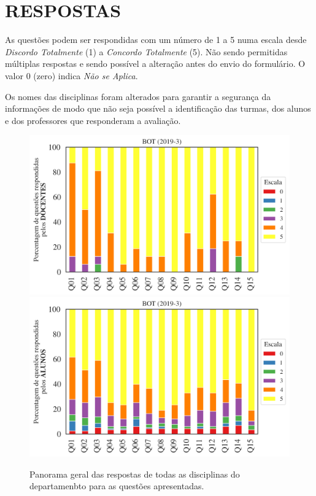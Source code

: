 \documentclass[a4paper,10pt]{article}
\begin{document}
\section{RESPOSTAS}
As questões podem ser respondidas com um número de 1 a 5 numa escala desde {\it Discordo Totalmente} (1) a {\it Concordo Totalmente} (5). Não sendo permitidas múltiplas respostas e sendo possível a alteração antes do envio do formulário. O valor 0 (zero) indica {\it Não se Aplica}.

Os nomes das disciplinas foram alterados para garantir a segurança da informações de modo que não seja possível a identificação das turmas, dos alunos  e dos professores que responderam a avaliação.

\begin{figure}[h]
\centering
\includegraphics[width=0.85\linewidth]{analise_geral_departamento_BOT_docentes.png}
\includegraphics[width=0.85\linewidth]{analise_geral_departamento_BOT_alunos.png}
\caption{\label{fig:analise_geral_departamento}            Panorama geral das respostas de todas as  disciplinas do departamenbto para as questões apresentadas.}
\end{figure}
\end{document}
